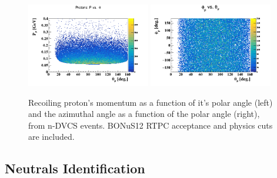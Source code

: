 \begin{figure}[htb]
\centering
   \includegraphics[width=0.48\textwidth,clip,trim=0mm 0mm 0mm 
   20mm]{figs/p_p_theta.png}
\includegraphics[width=0.48\textwidth,clip,trim=0mm 0mm 0mm 
   20mm]{figs/p_phi_theta.png}
   \caption{Recoiling proton's momentum as a function of it's polar angle 
   (left) and the azimuthal angle as a function of the polar angle (right), 
   from n-DVCS events. BONuS12 RTPC acceptance and physics cuts are included.}
   \label{fig:proton_kin}
\end{figure}
 

\subsection{Neutrals Identification} 

